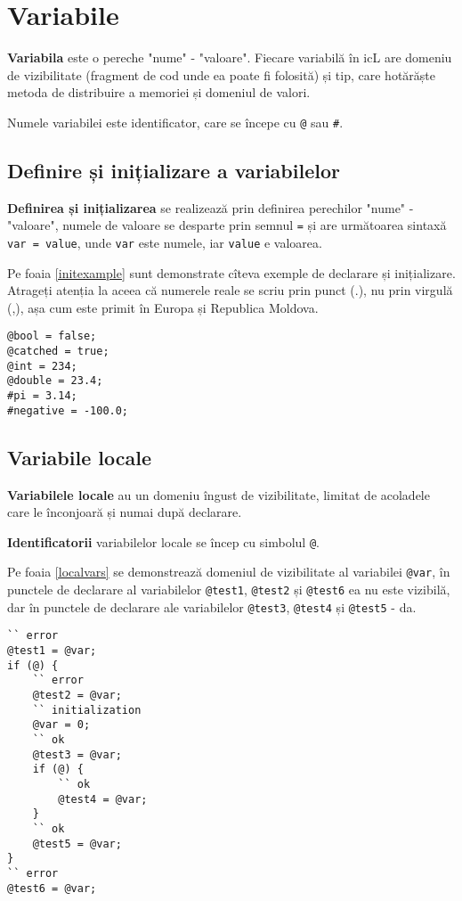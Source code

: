 \section{Variabile}

\textbf{Variabila} este o pereche "nume" - "valoare". Fiecare variabilă în icL are domeniu de vizibilitate (fragment de cod unde ea poate fi folosită) și tip, care hotărăște metoda de distribuire a memoriei și domeniul de valori.

Numele variabilei este identificator, care se începe cu \lstinline|@| sau {\color{blue2}\lstinline|#|}. 

\subsection{Definire și inițializare a variabilelor}

\textbf{Definirea și inițializarea} se realizează prin definirea perechilor "nume" - "valoare", numele de valoare se desparte prin semnul \lstinline|=| și are următoarea sintaxă \lstinline|var = value|, unde \lstinline|var| este numele, iar \lstinline|value| e valoarea.

Pe foaia \ref{initexample} sunt demonstrate cîteva exemple de declarare și inițializare. Atrageți atenția la aceea că numerele reale se scriu prin punct (.), nu prin virgulă (,), așa cum este primit în Europa și Republica Moldova.

\begin{lstlisting}[caption=Exemplu de declarare și inițializare al variabilelor,label=initexample]
@bool = false;
@catched = true;
@int = 234;
@double = 23.4;
#pi = 3.14;
#negative = -100.0;
\end{lstlisting}

\subsection{Variabile locale}

\textbf{Variabilele locale} au un domeniu îngust de vizibilitate, limitat de acoladele care le înconjoară și numai după declarare.

{\bf Identificatorii} variabilelor locale se încep cu simbolul \lstinline|@|.

Pe foaia \ref{localvars} se demonstrează domeniul de vizibilitate al variabilei \lstinline|@var|, în punctele de declarare al variabilelor \lstinline|@test1|, \lstinline|@test2| și \lstinline|@test6| ea nu este vizibilă, dar în punctele de declarare ale variabilelor \lstinline|@test3|, \lstinline|@test4| și \lstinline|@test5| - da.
\begin{lstlisting}[caption=Domeniul de vizibilitate al variabilei locale, label=localvars]
`` error
@test1 = @var;
if (@) {
	`` error
	@test2 = @var;
	`` initialization
	@var = 0;
	`` ok
	@test3 = @var;
	if (@) {
		`` ok
		@test4 = @var;
	}
	`` ok
	@test5 = @var;
}
`` error
@test6 = @var;
\end{lstlisting}


